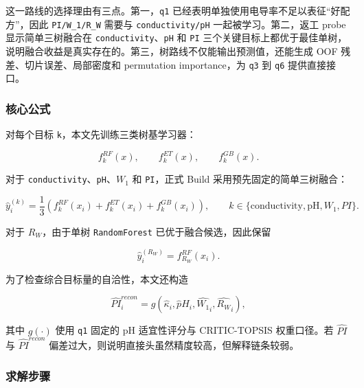 \documentclass[bwprint]{gmcmthesis}
\numberwithin{figure}{section}
\begin{document}
这一路线的选择理由有三点。第一，\texttt{q1} 已经表明单独使用电导率不足以表征“好配方”，因此 \texttt{PI/W\_1/R\_W} 需要与 \texttt{conductivity/pH} 一起被学习。第二，返工 probe 显示简单三树融合在 \texttt{conductivity}、\texttt{pH} 和 \texttt{PI} 三个关键目标上都优于最佳单树，说明融合收益是真实存在的。第三，树路线不仅能输出预测值，还能生成 OOF 残差、切片误差、局部密度和 permutation importance，为 \texttt{q3} 到 \texttt{q6} 提供直接接口。\par

\subsubsection{核心公式}

对每个目标 \texttt{k}，本文先训练三类树基学习器：\par

\[
f_k^{RF}(x), \qquad f_k^{ET}(x), \qquad f_k^{GB}(x).
\]

对于 \texttt{conductivity}、\texttt{pH}、$W_1$ 和 \texttt{PI}，正式 Build 采用预先固定的简单三树融合：\par

\[
\hat y_i^{(k)}=\frac{1}{3}\left(f_k^{RF}(x_i)+f_k^{ET}(x_i)+f_k^{GB}(x_i)\right),
\qquad
k\in\{\text{conductivity},\text{pH},W_1,PI\}.
\]

对于 $R_W$，由于单树 \texttt{RandomForest} 已优于融合候选，因此保留\par

\[
\hat y_i^{(R_W)} = f_{R_W}^{RF}(x_i).
\]

为了检查综合目标量的自洽性，本文还构造\par

\[
\widehat{PI}^{recon}_i = g(\hat \kappa_i,\hat pH_i,\widehat{W_1}_i,\widehat{R_W}_i),
\]

其中 $g(\cdot)$ 使用 \texttt{q1} 固定的 pH 适宜性评分与 CRITIC-TOPSIS 权重口径。若 $\widehat{PI}$ 与 $\widehat{PI}^{recon}$ 偏差过大，则说明直接头虽然精度较高，但解释链条较弱。\par

\subsubsection{求解步骤}
\end{document}
